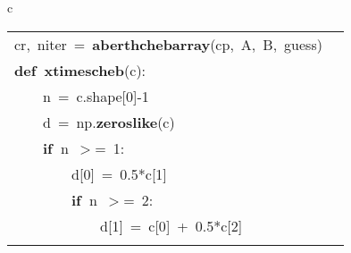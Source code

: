 \documentclass{article}\usepackage[]{graphicx}\usepackage[dvipsnames,table]{xcolor}
\makeatletter
\newcommand{\hlnum}[1]{\textcolor[rgb]{0.686,0.059,0.569}{#1}}%
\newcommand{\hlopt}[1]{\textcolor[rgb]{0,0,0}{#1}}%
\newcommand{\hldef}[1]{\textcolor[rgb]{0.345,0.345,0.345}{#1}}%
\newcommand{\hlkwa}[1]{\textcolor[rgb]{0.161,0.373,0.58}{\textbf{#1}}}%
\newcommand{\hlkwb}[1]{\textcolor[rgb]{0.69,0.353,0.396}{#1}}%
\newcommand{\hlkwd}[1]{\textcolor[rgb]{0.737,0.353,0.396}{\textbf{#1}}}%
\newenvironment{kframe}{%
 \def\at@end@of@kframe{}%
 \ifinner\ifhmode%
  \def\at@end@of@kframe{\end{minipage}}%
  \begin{minipage}{\columnwidth}%
 \fi\fi%
 \def\FrameCommand##1{\hskip\@totalleftmargin \hskip-\fboxsep
 \colorbox{shadecolor}{##1}\hskip-\fboxsep
     \hskip-\linewidth \hskip-\@totalleftmargin \hskip\columnwidth}%
 \MakeFramed {\advance\hsize-\width
   \@totalleftmargin\z@ \linewidth\hsize
   \@setminipage}}%
 {\par\unskip\endMakeFramed%
 \at@end@of@kframe}
\newenvironment{knitrout}{}{} %
\makeatother
\begin{document}
\begin{center}
\begin{tabular}{c}
\begin{tabular}{m{10cm}m{10cm}}
\begin{minipage}[m]{10cm}
\begin{knitrout}
\begin{kframe}
\hldef{cr}\hlopt{,\ }\hldef{niter\ }\hlopt{=\ }\hldef{}\hlkwd{aberth\textunderscore cheb\textunderscore array}\hldef{}\hlopt{(}\hldef{cp}\hlopt{,\ }\hldef{A}\hlopt{,\ }\hldef{B}\hlopt{,\ }\hldef{guess}\hlopt{)}\hldef{}\hspace*{\fill}
\mbox{}
\normalfont
\end{kframe}
\end{knitrout}
\end{minipage}
&
\begin{minipage}[m]{10cm}
\begin{knitrout}\tiny
\definecolor{shadecolor}{rgb}{0.969, 0.969, 0.969}\color{fgcolor}\begin{kframe}
\noindent
\ttfamily
\hldef{}\hlkwb{@njit}\hspace*{\fill}\\
\hldef{}\hlkwa{def\ }\hldef{}\hlkwd{\textunderscore x\textunderscore times\textunderscore cheb}\hldef{}\hlopt{(}\hldef{c}\hlopt{):}\hspace*{\fill}\\
\hldef{}\hldef{\ \ \ \ }\hldef{n\ }\hlopt{=\ }\hldef{c}\hlopt{.}\hldef{shape}\hlopt{{[}}\hldef{}\hlnum{0}\hldef{}\hlopt{{]}{-}}\hldef{}\hlnum{1}\hspace*{\fill}\\
\hldef{}\hldef{\ \ \ \ }\hldef{d\ }\hlopt{=\ }\hldef{np}\hlopt{.}\hldef{}\hlkwd{zeros\textunderscore like}\hldef{}\hlopt{(}\hldef{c}\hlopt{)}\hspace*{\fill}\\
\hldef{}\hldef{\ \ \ \ }\hldef{}\hlkwa{if\ }\hldef{n\ }\hlopt{$>$=\ }\hldef{}\hlnum{1}\hldef{}\hlopt{:}\hspace*{\fill}\\
\hldef{}\hldef{\ \ \ \ \ \ \ \ }\hldef{d}\hlopt{{[}}\hldef{}\hlnum{0}\hldef{}\hlopt{{]}\ =\ }\hldef{}\hlnum{0.5}\hldef{}\hlopt{{*}}\hldef{c}\hlopt{{[}}\hldef{}\hlnum{1}\hldef{}\hlopt{{]}}\hspace*{\fill}\\
\hldef{}\hldef{\ \ \ \ \ \ \ \ }\hldef{}\hlkwa{if\ }\hldef{n\ }\hlopt{$>$=\ }\hldef{}\hlnum{2}\hldef{}\hlopt{:}\hspace*{\fill}\\
\hldef{}\hldef{\ \ \ \ \ \ \ \ \ \ \ \ }\hldef{d}\hlopt{{[}}\hldef{}\hlnum{1}\hldef{}\hlopt{{]}\ =\ }\hldef{c}\hlopt{{[}}\hldef{}\hlnum{0}\hldef{}\hlopt{{]}\ +\ }\hldef{}\hlnum{0.5}\hldef{}\hlopt{{*}}\hldef{c}\hlopt{{[}}\hldef{}\hlnum{2}\hldef{}\hlopt{{]}}\hspace*{\fill}\\

\end{kframe}
\end{knitrout}
\end{minipage}
\end{tabular}
\end{tabular}
\end{center}
\end{document}
